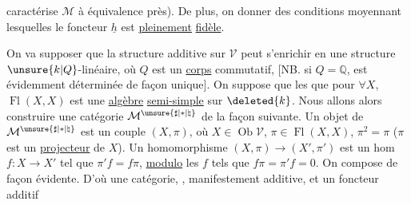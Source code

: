 caractérise \(\mathcal M\) à équivalence près). De plus, on
 donner des conditions moyennant
lesquelles le foncteur \(\underline h\) est \uline{pleinement}
\uline{fidèle}.

On va supposer que la structure additive
sur \(\mathcal V\) peut s'enrichir en une structure
\(\unsure{k|Q}\)-linéaire, où \(Q\) est un \uline{corps} commutatif,
[NB. si \(Q=\mathbb Q\), est évidemment déterminée
de façon unique]. On suppose que les
 que pour \(\forall X\), \(\operatorname{Fl}(X,X)\) est
une \uline{algèbre} 
\uline{semi-simple} sur \(\deleted{k}\). Nous allons
alors  construire une catégorie \(\mathcal M^{\unsure{\sharp|*|\natural}}\) de la
façon suivante. Un objet de \(\mathcal M^{\unsure{\sharp|*|\natural}}\) est
un couple \((X,\pi)\), où \(X\in\operatorname{Ob}\mathcal V\), \(\pi\in\operatorname{Fl}(X,X)\),
\(\pi^2=\pi\) (\(\pi\) est un \uline{projecteur} de \(X\)). Un
homomorphisme \((X,\pi)\longrightarrow(X',\pi')\) est
un hom \(f:X\longrightarrow X'\) tel que
\(\pi'f=f\pi\), \uline{modulo} les \(f\) tels que
\(f\pi=\pi'f=0\). On compose de façon
évidente. D'où une catégorie, , manifestement additive,
et un foncteur additif



